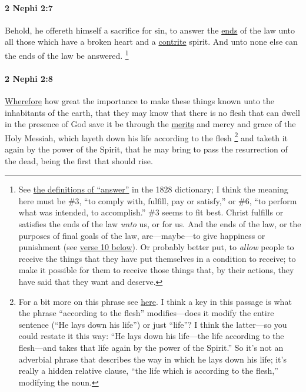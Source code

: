 		\paragraph{2 Nephi 2:7} %
			\label{2NEPHI-2-7}
			
			Behold, he offereth himself a sacrifice for sin,
			to answer the \hyperref[END]{ends} of the law unto all those
			which have a broken heart and a \hyperref[CONTRITE]{contrite} spirit.
			And unto none else can the ends of the law be answered.%
				\footnote{%
					\label{2NEPHI-2-7-answered}%
					See \hyperref[ANSWER-1828]{the definitions of ``answer''} in the 1828 dictionary; I think the meaning here must be \#3, ``to comply with, fulfill, pay or satisfy,'' or \#6, ``to perform what was intended, to accomplish.'' \#3 seems to fit best. Christ fulfills or satisfies the ends of the law \textit{unto} us, or for us. And the ends of the law, or the purposes of final goals of the law, are---maybe---to give happiness or punishment (see \hyperref[2NEPHI-2-10]{verse 10 below}). Or probably better put, to \textit{allow} people to receive the things that they have put themselves in a condition to receive; to make it possible for them to receive those things that, by their actions, they have said that they want and deserve.
					}
		
		\paragraph{2 Nephi 2:8} %
			\label{2NEPHI-2-8}
			
			\hyperref[WHEREFORE-1828]{Wherefore} how great the importance
			to make these things known unto the inhabitants of the earth,
			that they may know that there is no flesh
			that can dwell in the presence of God
			save it be through the \hyperref[MERIT]{merits} and mercy and grace of the Holy Messiah,
			which layeth down his life according to the flesh%
			\footnote{%
				\label{2NEPHI-2-8-flesh}%
				For a bit more on this phrase see \hyperref[FLESH-PHRASES]{here}.
				I think a key in this passage is what the phrase ``according to the flesh'' modifies---does it modify the entire sentence (``He lays down his life'') or just ``life''? I think the latter---so you could restate it this way: ``He lays down his life---the life according to the flesh---and takes that life again by the power of the Spirit.'' So it's not an adverbial phrase that describes the way in which he lays down his life; it's really a hidden relative clause, ``the life which is according to the flesh,'' modifying the noun.
				} 
			and taketh it again by the power of the Spirit,
			that he may bring to pass the resurrection of the dead,
			being the first that should rise.
	
